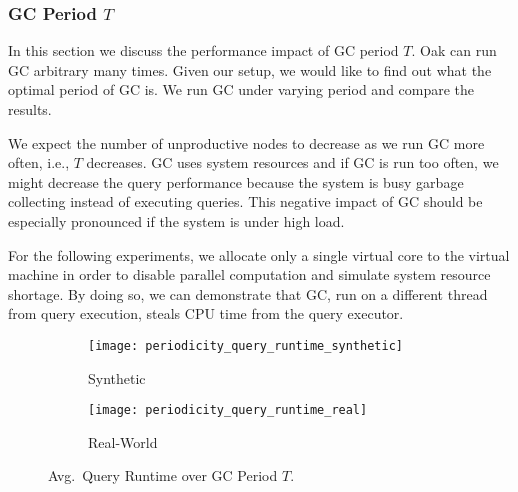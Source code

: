 \documentclass[abstracton,12pt]{scrartcl}
\theoremstyle{definition}
\begin{document}
\vspace{-0.3cm}

\subsubsection{GC Period $T$}

\label{sec:periodicity}

In this section we discuss the performance impact of GC period $T$. Oak can run
GC arbitrary many times. Given our setup, we would like to find out what the
optimal period of GC is. We run GC under varying period and compare
the results.

We expect the number of unproductive nodes to decrease as we run GC more often,
i.e., $T$ decreases. GC uses system resources and if GC is run too often,
we might decrease the query performance because the system is busy garbage
collecting instead of executing queries. This negative impact of GC should
be especially pronounced if the system is under high load.

For the following experiments, we allocate only a single virtual core to the
virtual machine in order to disable parallel computation and simulate system
resource shortage. 
By doing so, we can demonstrate that GC, run on a different thread from
query execution, steals CPU time from the query executor.

\vspace{-0.4cm}

\begin{figure}[H]
  \centering
  \begin{subfigure}{0.49\linewidth}
    \centering
    \caption{Synthetic}
    \texttt{[image: periodicity\_query\_runtime\_synthetic]}
    \label{fig:period_runtime_synthetic}
  \end{subfigure}
  \begin{subfigure}{0.49\linewidth}
    \centering
    \caption{Real-World}
    \texttt{[image: periodicity\_query\_runtime\_real]}
    \label{fig:period_runtime_real}
  \end{subfigure}
  \vspace{-0.65cm}
  \caption[Avg.\ Query Runtime over GC Period $T$]{
  Avg.\ Query Runtime over GC Period $T$.}
\end{figure}
\end{document}
